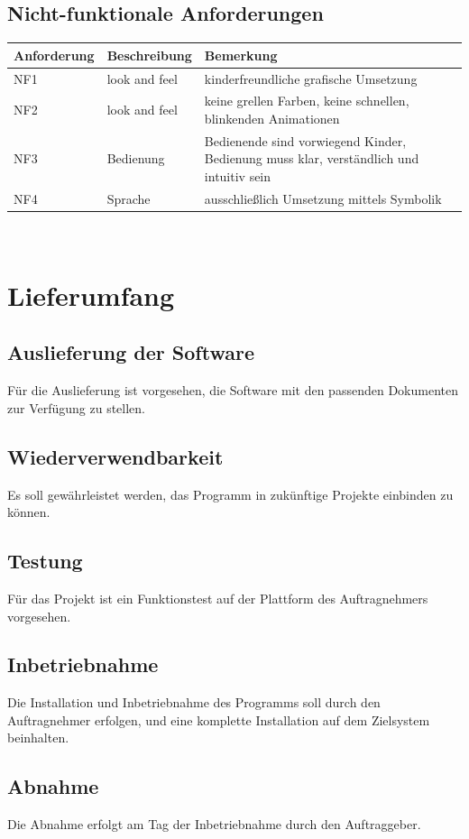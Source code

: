 \documentclass[12pt]{article}
\begin{document}
\subsection{Nicht-funktionale Anforderungen}
\begin{tabularx}{\textwidth}{|l|X|X|} \hline
\textbf{Anforderung} & \textbf{Beschreibung} & \textbf{Bemerkung}\\ \hline
NF1 & look and feel & kinderfreundliche grafische Umsetzung \\ \hline
NF2 & look and feel & keine grellen Farben, keine schnellen, blinkenden Animationen \\ \hline
NF3 & Bedienung & Bedienende sind vorwiegend Kinder, Bedienung muss klar, verständlich und intuitiv sein \\ \hline
NF4 & Sprache & ausschließlich Umsetzung mittels Symbolik \\ \hline
\end{tabularx}\\

\section{Lieferumfang}
\subsection{Auslieferung der Software}
Für die Auslieferung ist vorgesehen, die Software mit den passenden Dokumenten zur Verfügung zu stellen.

\subsection{Wiederverwendbarkeit}
Es soll gewährleistet werden, das Programm in zukünftige Projekte einbinden zu können.

\subsection{Testung}
Für das Projekt ist ein Funktionstest auf der Plattform des Auftragnehmers vorgesehen.

\subsection{Inbetriebnahme}
Die Installation und Inbetriebnahme des Programms soll durch den Auftragnehmer erfolgen, und eine komplette Installation auf dem Zielsystem beinhalten.

\subsection{Abnahme}
Die Abnahme erfolgt am Tag der Inbetriebnahme durch den Auftraggeber.
\end{document}
